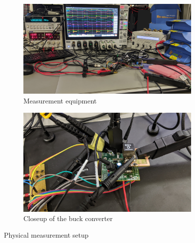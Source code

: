 \begin{figure}[H]
    \begin{subfigure}[b]{0.50\textwidth}
        \includegraphics[width=\textwidth]{Bilder/Kapitel4/Measurement_Work_Station_cropped.jpg}
        \caption{Measurement equipment}
    \end{subfigure}
    \begin{subfigure}[b]{0.50\textwidth}
        \includegraphics[width=\textwidth]{Bilder/Kapitel4/Measurement_Work_Station_close_cropped.jpg}
        \caption{Closeup of the buck converter}
    \end{subfigure}
    \caption{Physical measurement setup}
    \label{fig:hysteresis_comparison}							
\end{figure}

